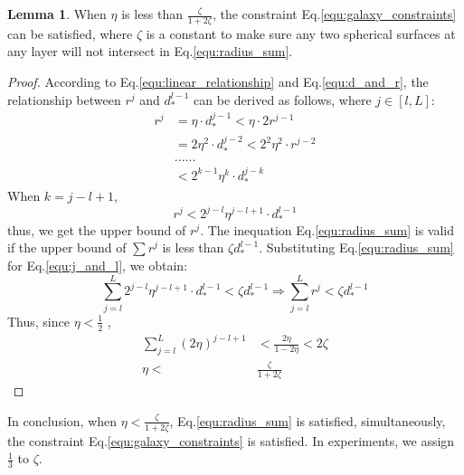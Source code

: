 \documentclass{article}
\theoremstyle{definition}
\newtheorem{lem}{Lemma}
\begin{document}
	 \begin{lem}
	 \label{prf:eta}
	 	When $\eta$ is less than $\frac{\zeta}{1+2\zeta}$, the constraint Eq.\ref{equ:galaxy_constraints} can be satisfied, where $\zeta$ is a constant to make sure any two spherical surfaces at any layer will not intersect in Eq.\ref{equ:radius_sum}. 
	 \end{lem}
	 \begin{proof} 
	 	According to Eq.\ref{equ:linear_relationship} and Eq.\ref{equ:d_and_r}, the relationship between $r^j$ and $d_*^{l-1}$ can be derived as follows, where $j \in [l, L]$:	
	 	\begin{align}
	 	\label{equ:derivation}
	 		\nonumber
	 		r^j &= \eta \cdot d_*^{j-1} < \eta \cdot 2r^{j-1} \\
	 		\nonumber
	 		&= 2\eta^2 \cdot d_*^{j-2} < 2^2\eta^2 \cdot r^{j-2} \\
	 		\nonumber
	 		&... ...\\
	 		&< 2^{k-1}\eta^k \cdot d_*^{j-k}
	 	\end{align}
	 	When $k=j-l+1$, 
	 	\begin{equation}
	 		\label{equ:j_and_l}
	 		r^j < 2^{j-l}\eta^{j-l+1} \cdot d_*^{l-1}
	 	\end{equation}
	 	thus, we get the upper bound of $r^j$. The inequation Eq.\ref{equ:radius_sum} is valid if the upper bound of $\sum r^j$ is less than $\zeta d_*^{l-1}$. Substituting Eq.\ref{equ:radius_sum} for Eq.\ref{equ:j_and_l}, we obtain:
	 	\begin{equation}
	 	\nonumber
	 	\sum_{j=l}^L 2^{j-l} \eta^{j-l+1} \cdot d_*^{l-1} < \zeta d_*^{l-1} \Rightarrow \sum_{j=l}^L r^j < \zeta d_*^{l-1} 
	 	\end{equation}
	 	Thus, since $\eta < \frac{1}{2}$ , 
	 	\begin{align}
	 	\nonumber
	 	\sum_{j=l}^L (2\eta)^{j-l+1}& < \frac{2\eta}{1-2\eta}< 2 \zeta \\
	 	\nonumber
	 	\eta <& \frac{\zeta}{1+2\zeta}
	 	\end{align}
	 \end{proof}
	 In conclusion, when $\eta < \frac{\zeta}{1+2\zeta}$, Eq.\ref{equ:radius_sum} is satisfied, simultaneously, the constraint Eq.\ref{equ:galaxy_constraints} is satisfied. In experiments, we assign $\frac{1}{3}$ to $\zeta$.
\end{document}

